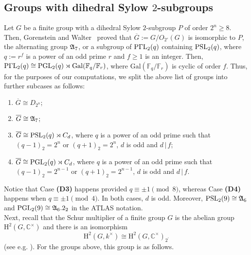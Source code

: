 \subsection{Groups with dihedral Sylow \texorpdfstring{$2$}{2}-subgroups}\label{ssec:dihedralSylow2}%
Let $G$ be a finite group with a dihedral Sylow $2$-subgroup $P$ of order $2^n\geq 8$. Then, Gorenstein and Walter~\cite[Theorem~1]{GorensteinWalter} proved 
that $\overline{G}:=G/O_{2'}(G)$ is isomorphic to $P$, the alternating group ${\mathfrak{A}}_7$,  or a subgroup of $\operatorname{P{\Gamma}L}_2(q)$ containing $\operatorname{PSL}_2(q)$, 
where $q:=r^f$ is a power of an odd prime $r$ and $f\geq 1$ is an integer. Then,  
$\operatorname{P{\Gamma}L}_2(q)\cong \operatorname{PGL}_2(q)\rtimes 
{\mathrm{Gal}}(\mathbb F_{q}/\mathbb F_{r})$,  
where ${\mathrm{Gal}}(\mathbb F_{q}/\mathbb F_{r})$  
is cyclic of order $f$. Thus, for the purposes of our computations, we split the above list of groups into further subcases as follows:
\begin{enumerate}[label={\bf(D\arabic*)}, leftmargin=12mm]
   \item $\overline{G}\cong D_{2^n}$;
   \item $\overline{G}\cong {\mathfrak{A}}_7$;
   \item  $\overline{G}\cong \operatorname{PSL}_2(q)\rtimes C_d$,  where $q$ is a power of an odd prime such that $(q-1)_2=2^{n}$ or $(q+1)_2=2^{n}$, $d$ is odd and $d\,|\,f$;
   \item $\overline{G}\cong \operatorname{PGL}_2(q)\rtimes C_d$,  where $q$ is a power of an odd prime such that $(q-1)_2=2^{n-1}$ or $(q+1)_2=2^{n-1}$, $d$ is odd and $d\,|\,f$.
\end{enumerate}
Notice that Case {\bf(D3)} happens provided $q\equiv\pm 1\pmod{8}$, whereas Case {\bf(D4)} happens when  $q\equiv\pm 1\pmod{4}$. In both cases, $d$ is odd. %
Moreover, $\operatorname{PSL}_2(9)\cong {\mathfrak{A}}_6$ and $\operatorname{PGL}_2(9)\cong {\mathfrak{A}}_6.2_2$ in the ATLAS notation. \\

\noindent Next, recall that the Schur multiplier of a finite group $G$ is the abelian group ${\mathrm{H}}^2(G,\mathbb{C}^\times)$ and there is an isomorphism 
\[
    {\mathrm{H}}^2(G,k^\times)\cong {\mathrm{H}}^2(G,\mathbb{C}^\times)_{2^\prime} \tag{$\ast$}
\]
(see e.g. \cite[2.1.14 Proposition]{KarpilovskySchurMultBook}). For the groups above, this group is as follows. 


